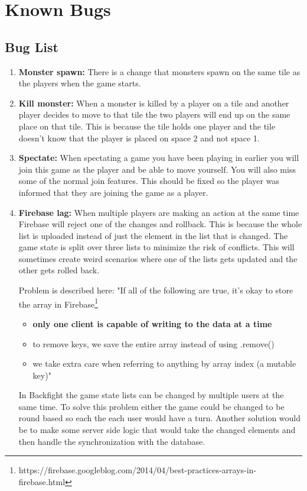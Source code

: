 \pagestyle{Uni}

\chapter{Known Bugs}

\section{Bug List}

\begin{enumerate}
	\item \textbf{Monster spawn:} There is a change that monsters spawn on the same tile as the players when the game starts.
	
	\item \textbf{Kill monster:} When a monster is killed by a player on a tile and another player decides to move to that tile the two players will end up on the same place on that tile. This is because the tile holds one player and the tile doesn't know that the player is placed on space 2 and not space 1.
		
	\item \textbf{Spectate:} When spectating a game you have been playing in earlier you will join this game as the player and be able to move yourself. You will also miss some of the normal join features. This should be fixed so the player was informed that they are joining the game as a player.

	\item \textbf{Firebase lag:} When multiple players are making an action at the same time Firebase will reject one of the changes and rollback. This is because the whole list is uploaded instead of just the element in the list that is changed. The game state is split over three lists to minimize the risk of conflicts. This will sometimes create weird scenarios where one of the lists gets updated and the other gets rolled back.
	
	Problem is described here: "If all of the following are true, it's okay to store the array in Firebase\footnote{https://firebase.googleblog.com/2014/04/best-practices-arrays-in-firebase.html}
	
	\begin{itemize}
		\item \textbf{only one client is capable of writing to the data at a time}
		\item to remove keys, we save the entire array instead of using .remove()
		\item we take extra care when referring to anything by array index (a mutable key)"
	\end{itemize}
	In Backfight the game state lists can be changed by multiple users at the same time. To solve this problem either the game could be changed to be round based so each the each user would have a turn. Another solution would be to make some server side logic that would take the changed elements and then handle the synchronization with the database.
	

\end{enumerate}
